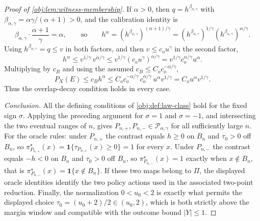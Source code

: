\documentclass[11pt]{article}
\begin{document}
\begin{proof}[Proof of \cref{obj:lem:witness-membership}]
If \(\alpha>0\), then \(q=h^{\beta_{\alpha,\gamma}}\) with \(\beta_{\alpha,\gamma}=\alpha\gamma/(\alpha+1)>0\), and the calibration identity is
\[
\beta_{\alpha,\gamma}\cdot\frac{\alpha+1}{\gamma}=\alpha,
\qquad\text{so}\qquad
h^\alpha=\left(h^{\beta_{\alpha,\gamma}}\right)^{(\alpha+1)/\gamma}
=\left(h^{\beta_{\alpha,\gamma}}\right)^{1/\gamma}\left(h^{\beta_{\alpha,\gamma}}\right)^{\alpha/\gamma}.
\]
Using \(h^{\beta_{\alpha,\gamma}}=q\le v\) in both factors, and then \(v\le c_ou^\gamma\) in the second factor,
\[
h^\alpha
\le
v^{1/\gamma}\,v^{\alpha/\gamma}
\le
v^{1/\gamma}\left(c_ou^\gamma\right)^{\alpha/\gamma}
=
v^{1/\gamma}c_o^{\alpha/\gamma}u^\alpha .
\]
Multiplying by \(c_B\) and using the assumed \(c_B\le C_oc_o^{-\alpha/\gamma}\),
\[
P_X(E)\le c_Bh^\alpha
\le
C_oc_o^{-\alpha/\gamma}\,c_o^{\alpha/\gamma}\,u^\alpha v^{1/\gamma}
=
C_ou^\alpha v^{1/\gamma}.
\]
Thus the overlap-decay condition holds in every case.

\emph{Conclusion.}  All the defining conditions of \cref{obj:def:law-class} hold for the fixed sign \(\sigma\).  Applying the preceding argument for \(\sigma=1\) and \(\sigma=-1\), and intersecting the two eventual ranges of \(n\), gives \(P_{n,+},P_{n,-}\in\mathcal P_{\alpha,\gamma}\) for all sufficiently large \(n\). %
For the oracle rules: under \(P_{n,+}\) the contrast equals \(h\ge0\) on \(B_n\) and \(\tau_0>0\) off \(B_n\), so \(\pi^\star_{P_{n,+}}(x)=\mathbf 1\{\tau_{P_{n,+}}(x)\ge0\}=1\) for every \(x\). %
Under \(P_{n,-}\) the contrast equals \(-h<0\) on \(B_n\) and \(\tau_0>0\) off \(B_n\), so \(\pi^\star_{P_{n,-}}(x)=1\) exactly when \(x\notin B_n\), that is \(\pi^\star_{P_{n,-}}(x)=\mathbf 1\{x\notin B_n\}\). %
If these two maps belong to \(\Pi\), the displayed oracle identities identify the two policy actions used in the associated two-point reduction.  Finally, the normalization \(0<u_0<2\) is exactly what permits the displayed choice \(\tau_0=(u_0+2)/2\in(u_0,2)\), which is both strictly above the margin window and compatible with the outcome bound \(|Y|\le1\). %
\end{proof}
\end{document}
